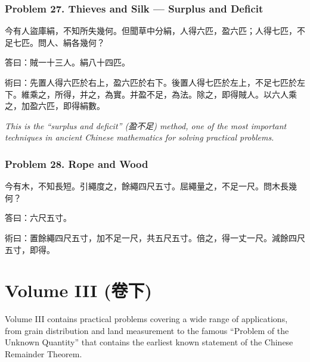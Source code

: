 \documentclass[11pt,a4paper]{article}
\newcommand{\zh}[1]{{\CJKfamily{}#1}}
\begin{document}
\subsubsection*{Problem 27. Thieves and Silk --- Surplus and Deficit}

\begin{problembox}[title=\zh{問}]
\zh{今有人盜庫絹，不知所失幾何。但聞草中分絹，人得六匹，盈六匹；人得七匹，不足七匹。問人、絹各幾何？}
\end{problembox}
\begin{answerbox}[title=\zh{答}]
\zh{答曰：賊一十三人。絹八十四匹。}
\end{answerbox}
\begin{methodbox}[title=\zh{術}]
\zh{術曰：先置人得六匹於右上，盈六匹於右下。後置人得七匹於左上，不足七匹於左下。維乘之，所得，并之，為實。并盈不足，為法。除之，即得賊人。以六人乘之，加盈六匹，即得絹數。}
\end{methodbox}

\textit{This is the ``surplus and deficit'' (\zh{盈不足}) method, one of the most important techniques in ancient Chinese mathematics for solving practical problems.}

\subsubsection*{Problem 28. Rope and Wood}

\begin{problembox}[title=\zh{問}]
\zh{今有木，不知長短。引繩度之，餘繩四尺五寸。屈繩量之，不足一尺。問木長幾何？}
\end{problembox}
\begin{answerbox}[title=\zh{答}]
\zh{答曰：六尺五寸。}
\end{answerbox}
\begin{methodbox}[title=\zh{術}]
\zh{術曰：置餘繩四尺五寸，加不足一尺，共五尺五寸。倍之，得一丈一尺。減餘四尺五寸，即得。}
\end{methodbox}

\newpage

\section{Volume III (\zh{卷下})}

Volume III contains practical problems covering a wide range of applications, from grain distribution and land measurement to the famous ``Problem of the Unknown Quantity'' that contains the earliest known statement of the Chinese Remainder Theorem.
\end{document}

